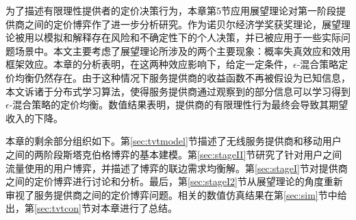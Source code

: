 为了描述有限理性提供者的定价决策行为，本章第5节应用{\kaishu 展望理论}\cite{Kahneman}对第一阶段提供商之间的定价博弈作了进一步分析研究。作为诺贝尔经济学奖获奖理论，展望理论被用以模拟和解释存在风险和不确定性下的个人决策\cite{Tianming,Yu}，并已被应用于一些实际问题场景中。本文主要考虑了展望理论所涉及的两个主要现象：{\kaishu 概率失真效应}和{\kaishu 效用框架效应}。本章的分析表明，在这两种效应影响下​​，给定一定条件，$\epsilon$-混合策略定价均衡仍然存在。由于这种情况下服务提供商的收益函数不再被假设为已知信息，本文诉诸于分布式学习算法，使得服务提供商通过观察到的部分信息可以学习得到$\epsilon$-混合策略的定价均衡。数值结果表明，提供商的有限理性行为最终会导致其期望收入的下降。

本章的剩余部分组织如下。第\ref{sec:tvtmodel}节描述了无线服务提供商和移动用户之间的两阶段斯塔克伯格博弈的基本建模。第\ref{sec:stageII}节研究了针对用户之间流量使用的用户博弈，并描述了博弈的联边需求均衡解。第\ref{sec:stageI}节对提供商之间的定价博弈进行讨论和分析。最后，第\ref{sec:stageI2}节从展望理论的角度重新审视了服务提供商之间的定价博弈问题。相关的数值仿真结果在第\ref{sec:sim}节中给出，第\ref{sec:tvtcon}节对本章进行了总结。

